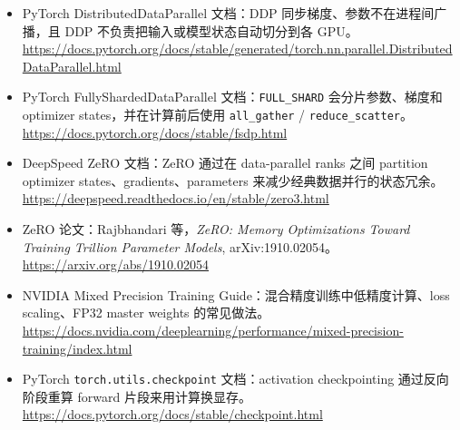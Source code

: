 \begingroup
\small
\sloppy
\begin{itemize}[leftmargin=1.5em]
  \item PyTorch DistributedDataParallel 文档：DDP 同步梯度、参数不在进程间广播，且 DDP 不负责把输入或模型状态自动切分到各 GPU。\\
  \url{https://docs.pytorch.org/docs/stable/generated/torch.nn.parallel.DistributedDataParallel.html}
  \item PyTorch FullyShardedDataParallel 文档：\texttt{FULL\_SHARD} 会分片参数、梯度和 optimizer states，并在计算前后使用 \texttt{all\_gather} / \texttt{reduce\_scatter}。\\
  \url{https://docs.pytorch.org/docs/stable/fsdp.html}
  \item DeepSpeed ZeRO 文档：ZeRO 通过在 data-parallel ranks 之间 partition optimizer states、gradients、parameters 来减少经典数据并行的状态冗余。\\
  \url{https://deepspeed.readthedocs.io/en/stable/zero3.html}
  \item ZeRO 论文：Rajbhandari 等，\emph{ZeRO: Memory Optimizations Toward Training Trillion Parameter Models}, arXiv:1910.02054。\\
  \url{https://arxiv.org/abs/1910.02054}
  \item NVIDIA Mixed Precision Training Guide：混合精度训练中低精度计算、loss scaling、FP32 master weights 的常见做法。\\
  \url{https://docs.nvidia.com/deeplearning/performance/mixed-precision-training/index.html}
  \item PyTorch \texttt{torch.utils.checkpoint} 文档：activation checkpointing 通过反向阶段重算 forward 片段来用计算换显存。\\
  \url{https://docs.pytorch.org/docs/stable/checkpoint.html}
\end{itemize}
\endgroup
